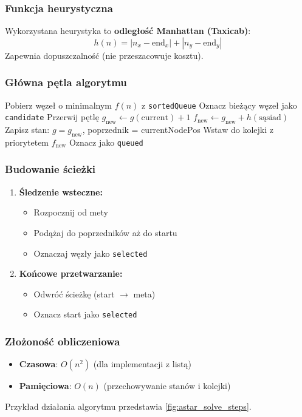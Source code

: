 \documentclass[../../../../doc.tex]{subfiles}
\begin{document}
\subsubsection{Funkcja heurystyczna}
Wykorzystana heurystyka to \textbf{odległość Manhattan (Taxicab)}:
\[
  h(n) = |n_x - \text{end}_x| + |n_y - \text{end}_y|
\]
Zapewnia dopuszczalność (nie przeszacowuje kosztu).

\subsubsection{Główna pętla algorytmu}
\begin{algorithmic}
  \STATE Pobierz węzeł o minimalnym $f(n)$ z \texttt{sortedQueue}
  \STATE Oznacz bieżący węzeł jako \texttt{candidate}
  \STATE Przerwij pętlę
  \ENDIF
  \STATE $g_{\text{new}} \gets g(\text{current}) + 1$
  \STATE $f_{\text{new}} \gets g_{\text{new}} + h(\text{sąsiad})$
  \STATE Zapisz stan: $g = g_{\text{new}}$, poprzednik = currentNodePos
  \STATE Wstaw do kolejki z priorytetem $f_{\text{new}}$
  \STATE Oznacz jako \texttt{queued}
  \ENDIF
  \ENDFOR
  \ENDWHILE
\end{algorithmic}

\subsubsection{Budowanie ścieżki}
\begin{enumerate}
  \item \textbf{Śledzenie wsteczne:}
        \begin{itemize}
          \item Rozpocznij od mety
          \item Podążaj do poprzedników aż do startu
          \item Oznaczaj węzły jako \texttt{selected}
        \end{itemize}
  \item \textbf{Końcowe przetwarzanie:}
        \begin{itemize}
          \item Odwróć ścieżkę (start $\rightarrow$ meta)
          \item Oznacz start jako \texttt{selected}
        \end{itemize}
\end{enumerate}


\subsubsection{Złożoność obliczeniowa}
\begin{itemize}
  \item \textbf{Czasowa}: $O(n^2)$ (dla implementacji z listą)
  \item \textbf{Pamięciowa}: $O(n)$ (przechowywanie stanów i kolejki)
\end{itemize}
Przykład działania algorytmu przedstawia \cref{fig:astar_solve_steps}.

\begin{multicols}{2}
  
\end{multicols}
\end{document}
